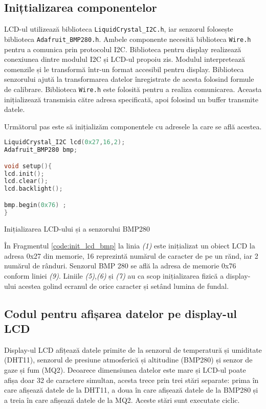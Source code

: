 \subsection{Inițtializarea componentelor}
LCD-ul utilizează biblioteca \texttt{LiquidCrystal\_I2C.h}\cite{lib_lcd}, iar senzorul folosește biblioteca \texttt{Adafruit\_BMP280.h}\cite{lib_bmp280}. Ambele componente necesită biblioteca \texttt{Wire.h}\cite{lib_wire} pentru a comunica prin protocolul I2C. Biblioteca pentru display realizează conexiunea dintre modulul I2C și LCD-ul propoiu zis. Modulul interpretează comenzile și le transformă într-un format accesibil pentru display. Biblioteca senzorului ajută la transformarea datelor înregistrate de acesta folosind formule de calibrare. Biblioteca \texttt{Wire.h} este folosită pentru a realiza comunicarea. Aceasta inițializează transmisia către adresa specificată, apoi folosind un buffer transmite datele.


Următorul pas este să inițializăm componentele cu adresele la care se află acestea.

\begin{code}[H]
\begin{lstlisting}[language=C++]
LiquidCrystal_I2C lcd(0x27,16,2);
Adafruit_BMP280 bmp;

void setup(){
lcd.init();
lcd.clear();
lcd.backlight();

bmp.begin(0x76) ;
}
\end{lstlisting}
\caption{Inițializarea LCD-ului și a senzorului BMP280}
\label{code:init_lcd_bmp}
\end{code}

În Fragmentul \ref{code:init_lcd_bmp} la linia \textit{(1)} este inițializat un obiect LCD la adresa 0x27 din memorie, 16 reprezintă numărul de caracter de pe un rănd, iar 2 numărul de rânduri. Senzorul BMP 280 se află la adresa de memorie 0x76 conform liniei \textit{(9)}. Liniile \textit{(5)},\textit{(6)} și \textit{(7)} au ca scop inițializarea fizică a display-ului acestea golind ecranul de orice caracter și setând lumina de fundal.

\subsection{Codul pentru afișarea datelor pe display-ul LCD}
Display-ul LCD afițează datele primite de la senzorul de temperatură și umiditate (DHT11), senzorul de presiune atmosferică și altitudine (BMP280) și senzor de gaze și fum (MQ2). Deoarece dimensiunea datelor este mare și LCD-ul poate afișa doar 32 de caractere simultan, acesta trece prin trei stări separate: prima în care afișează datele de la DHT11, a doua în care afișează datele de la BMP280 și a treia în care afișează datele de la MQ2. Aceste stări sunt executate ciclic.

